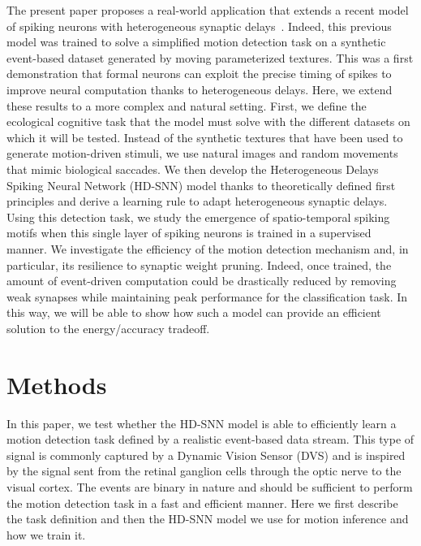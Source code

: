\documentclass[default]{sn-jnl}%
\theoremstyle{thmstyleone}%
\theoremstyle{thmstyletwo}%
\theoremstyle{thmstylethree}%
\begin{document}
The present paper proposes a real-world application that extends a recent model of spiking neurons with heterogeneous synaptic delays~\cite{grimaldi_learning_2022}. Indeed, this previous model was trained to solve a simplified motion detection task on a synthetic event-based dataset generated by moving parameterized textures. This was a first demonstration that formal neurons can exploit the precise timing of spikes to improve neural computation thanks to heterogeneous delays. Here, we extend these results to a more complex and natural setting. First, we define the ecological cognitive task that the model must solve with the different datasets on which it will be tested. Instead of the synthetic textures that have been used to generate motion-driven stimuli, we use natural images and random movements that mimic biological saccades. We then develop the Heterogeneous Delays Spiking Neural Network (HD-SNN) model thanks to theoretically defined first principles and derive a learning rule to adapt heterogeneous synaptic delays. Using this detection task, we study the emergence of spatio-temporal spiking motifs when this single layer of spiking neurons is trained in a supervised manner. We investigate the efficiency of the motion detection mechanism and, in particular, its resilience to synaptic weight pruning. Indeed, once trained, the amount of event-driven computation could be drastically reduced by removing weak synapses while maintaining peak performance for the classification task. In this way, we will be able to show how such a model can provide an efficient solution to the energy/accuracy tradeoff.
%
\section{Methods}
\label{sec:methods}
In this paper, we test whether the HD-SNN model is able to efficiently learn a motion detection task defined by a realistic event-based data stream. This type of signal is commonly captured by a Dynamic Vision Sensor (DVS) and is inspired by the signal sent from the retinal ganglion cells through the optic nerve to the visual cortex. The events are binary in nature and should be sufficient to perform the motion detection task in a fast and efficient manner. Here we first describe the task definition and then the HD-SNN model we use for motion inference and how we train it.
%
\end{document}
